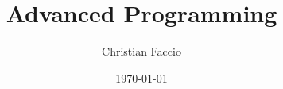 \documentclass[a4paper,12pt]{report}
\institute{UniTs - University of Trieste}
\title{Advanced Programming}
\author{Christian Faccio}
\date{\today}
\begin{document}
\maketitle



\toc

%




\printbibliography
\end{document}
